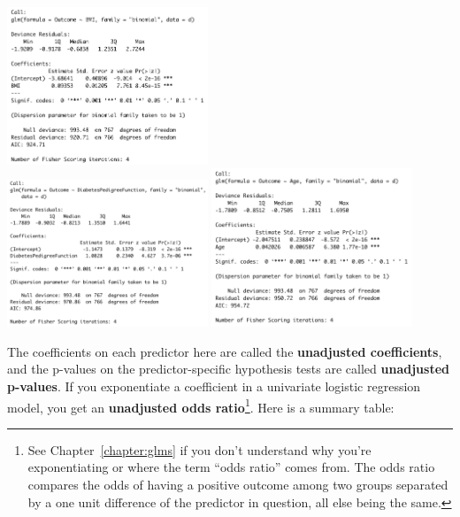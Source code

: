 \begin{center}
\includegraphics[width=0.45\textwidth]{img/cor-example-bmi.png} \\[2mm]
\includegraphics[width=0.45\textwidth]{img/cor-example-diab-ped-funct.png}
\includegraphics[width=0.45\textwidth]{img/cor-example-age.png}
\end{center}

The coefficients on each predictor here are called the \textbf{unadjusted coefficients}, and the p-values on the predictor-specific hypothesis tests are called  \textbf{unadjusted p-values}. If you exponentiate a coefficient in a univariate logistic regression model, you get an \textbf{unadjusted odds ratio}\footnote{See Chapter~\ref{chapter:glms} if you don't understand why you're exponentiating or where the term ``odds ratio'' comes from. The odds ratio compares the odds of having a positive outcome among two groups separated by a one unit difference of the predictor in question, all else being the same.}. Here is a summary table:
\vspace{-3mm}

